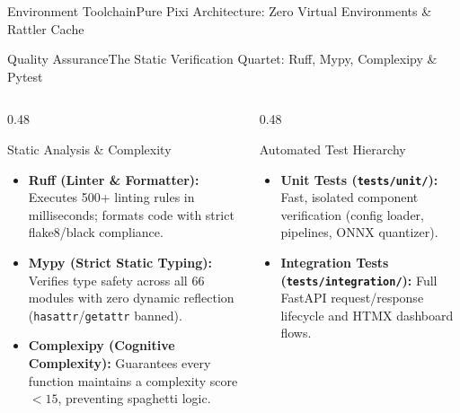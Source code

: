 \begin{frame}{Environment Toolchain}{Pure Pixi Architecture: Zero Virtual Environments \& Rattler Cache}
\end{frame}

\begin{frame}{Quality Assurance}{The Static Verification Quartet: Ruff, Mypy, Complexipy \& Pytest}
    \begin{columns}[T]
        \begin{column}{0.48\textwidth}
            \begin{block}{Static Analysis \& Complexity}
                \begin{itemize}\footnotesize
                    \item \textbf{Ruff (Linter \& Formatter):} Executes 500+ linting rules in milliseconds; formats code with strict flake8/black compliance.
                    \item \textbf{Mypy (Strict Static Typing):} Verifies type safety across all 66 modules with zero dynamic reflection (\texttt{hasattr}/\texttt{getattr} banned).
                    \item \textbf{Complexipy (Cognitive Complexity):} Guarantees every function maintains a complexity score $< 15$, preventing spaghetti logic.
                \end{itemize}
            \end{block}
        \end{column}
        \begin{column}{0.48\textwidth}
            \begin{block}{Automated Test Hierarchy}
                \begin{itemize}\footnotesize
                    \item \textbf{Unit Tests (\texttt{tests/unit/}):} Fast, isolated component verification (config loader, pipelines, ONNX quantizer).
                    \item \textbf{Integration Tests (\texttt{tests/integration/}):} Full FastAPI request/response lifecycle and HTMX dashboard flows.

\end{itemize}
\end{block}
\end{column}
\end{columns}
\end{frame}
